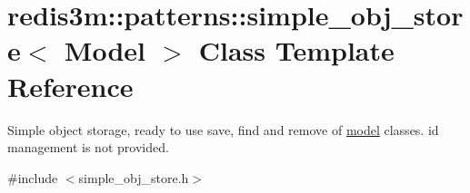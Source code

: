 \hypertarget{classredis3m_1_1patterns_1_1simple__obj__store}{\section{redis3m\-:\-:patterns\-:\-:simple\-\_\-obj\-\_\-store$<$ Model $>$ Class Template Reference}
\label{classredis3m_1_1patterns_1_1simple__obj__store}
}


Simple object storage, ready to use save, find and remove of \hyperlink{classredis3m_1_1patterns_1_1model}{model} classes. id management is not provided.  




{\ttfamily \#include $<$simple\-\_\-obj\-\_\-store.\-h$>$}

